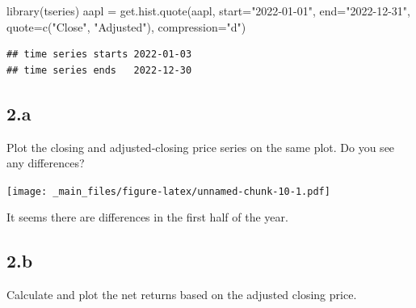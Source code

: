 \documentclass[
  oneside]{book}
\newenvironment{Shaded}{\begin{snugshade}}{\end{snugshade}}
\newcommand{\AttributeTok}[1]{\textcolor[rgb]{0.77,0.63,0.00}{#1}}
\newcommand{\FunctionTok}[1]{\textcolor[rgb]{0.00,0.00,0.00}{#1}}
\newcommand{\NormalTok}[1]{#1}
\newcommand{\OtherTok}[1]{\textcolor[rgb]{0.56,0.35,0.01}{#1}}
\newcommand{\SpecialCharTok}[1]{\textcolor[rgb]{0.00,0.00,0.00}{#1}}
\newcommand{\StringTok}[1]{\textcolor[rgb]{0.31,0.60,0.02}{#1}}
\begin{document}
\begin{Shaded}
\begin{Highlighting}[]
\FunctionTok{library}\NormalTok{(tseries)}
\NormalTok{aapl }\OtherTok{=} \FunctionTok{get.hist.quote}\NormalTok{(}\StringTok{\textquotesingle{}aapl\textquotesingle{}}\NormalTok{, }\AttributeTok{start=}\StringTok{"2022{-}01{-}01"}\NormalTok{, }\AttributeTok{end=}\StringTok{"2022{-}12{-}31"}\NormalTok{,}
                      \AttributeTok{quote=}\FunctionTok{c}\NormalTok{(}\StringTok{"Close"}\NormalTok{, }\StringTok{"Adjusted"}\NormalTok{), }\AttributeTok{compression=}\StringTok{"d"}\NormalTok{)}
\end{Highlighting}
\end{Shaded}

\begin{verbatim}
## time series starts 2022-01-03
## time series ends   2022-12-30
\end{verbatim}

\hypertarget{a}{%
\subsection{2.a}\label{a}}

Plot the closing and adjusted-closing price series on the same plot. Do you see any differences?

\begin{Shaded}
\end{Shaded}

\texttt{[image: \_main\_files/figure-latex/unnamed-chunk-10-1.pdf]}

It seems there are differences in the first half of the year.

\hypertarget{b}{%
\subsection{2.b}\label{b}}

Calculate and plot the net returns based on the adjusted closing price.
\end{document}
